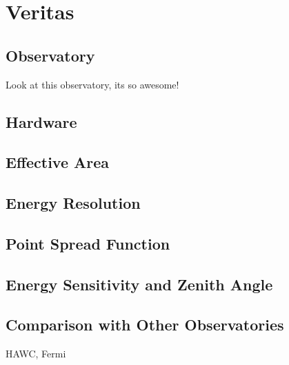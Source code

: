 \cleartooddpage[\thispagestyle{empty}]
\chapter{Veritas}

\section{Observatory}
Look at this observatory, its so awesome!

\section{Hardware}

\section{Effective Area}

\section{Energy Resolution}

\section{Point Spread Function}

\section{Energy Sensitivity and Zenith Angle}

\section{Comparison with Other Observatories}
HAWC, Fermi
